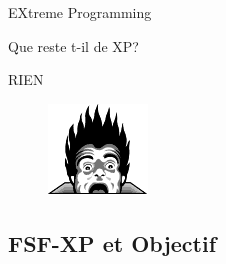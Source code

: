 \begin{frame}{EXtreme Programming}
  \begin{alertblock}{Que reste t-il de XP?}
    \begin{center}
      RIEN
      \begin{figure}
        \includegraphics[scale=0.7]{img/coding_horror.png}
      \end{figure}
    \end{center}
    \end{alertblock}
\end{frame}


\subsection{FSF-XP et Objectif}

